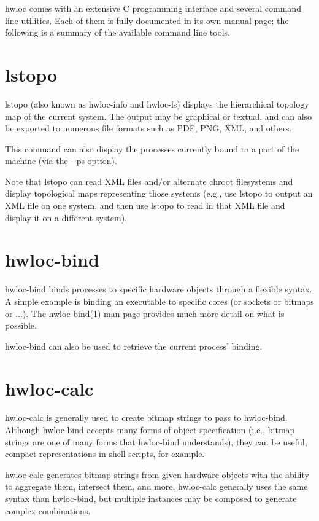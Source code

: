 hwloc comes with an extensive C programming interface and several command line utilities. Each of them is fully documented in its own manual page; the following is a summary of the available command line tools.\hypertarget{a00002_cli_lstopo}{}\section{lstopo}\label{a00002_cli_lstopo}
lstopo (also known as hwloc-\/info and hwloc-\/ls) displays the hierarchical topology map of the current system. The output may be graphical or textual, and can also be exported to numerous file formats such as PDF, PNG, XML, and others.

This command can also display the processes currently bound to a part of the machine (via the -\/-\/ps option).

Note that lstopo can read XML files and/or alternate chroot filesystems and display topological maps representing those systems (e.g., use lstopo to output an XML file on one system, and then use lstopo to read in that XML file and display it on a different system).\hypertarget{a00002_cli_hwloc_bind}{}\section{hwloc-\/bind}\label{a00002_cli_hwloc_bind}
hwloc-\/bind binds processes to specific hardware objects through a flexible syntax. A simple example is binding an executable to specific cores (or sockets or bitmaps or ...). The hwloc-\/bind(1) man page provides much more detail on what is possible.

hwloc-\/bind can also be used to retrieve the current process' binding.\hypertarget{a00002_cli_hwloc_calc}{}\section{hwloc-\/calc}\label{a00002_cli_hwloc_calc}
hwloc-\/calc is generally used to create bitmap strings to pass to hwloc-\/bind. Although hwloc-\/bind accepts many forms of object specification (i.e., bitmap strings are one of many forms that hwloc-\/bind understands), they can be useful, compact representations in shell scripts, for example.

hwloc-\/calc generates bitmap strings from given hardware objects with the ability to aggregate them, intersect them, and more. hwloc-\/calc generally uses the same syntax than hwloc-\/bind, but multiple instances may be composed to generate complex combinations.

